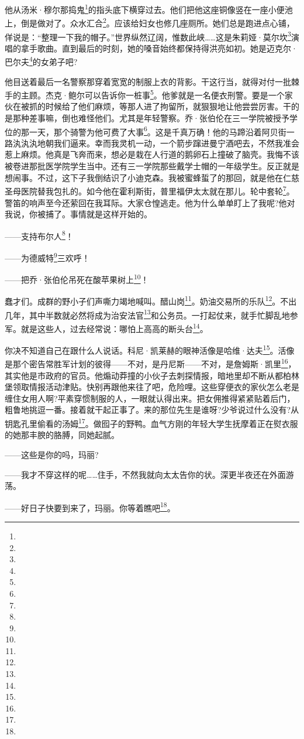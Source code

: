 \par 他从汤米·穆尔那捣鬼\footnote{}的指头底下横穿过去。他们把他这座铜像竖在一座小便池上，倒是做对了。众水汇合\footnote{}。应该给妇女也修几座厕所。她们总是跑进点心铺，佯说是：“整理一下我的帽子。”世界纵然辽阔，惟数此峡……这是朱莉娅·莫尔坎\footnote{}演唱的拿手歌曲。直到最后的时刻，她的嗓音始终都保持得洪亮如初。她是迈克尔·巴尔夫\footnote{}的女弟子吧?
\par 他目送着最后一名警察那穿着宽宽的制服上衣的背影。干这行当，就得对付一批棘手的主顾。杰克·鲍尔可以告诉你一桩事\footnote{}。他爹就是一名便衣刑警。要是一个家伙在被抓的时候给了他们麻烦，等那人进了拘留所，就狠狠地让他尝尝厉害。干的是那种差事嘛，倒也难怪他们。尤其是年轻警察。乔·张伯伦在三一学院被授予学位的那一天，那个骑警为他可费了大事\footnote{}。这是千真万确！他的马蹄沿着阿贝街一路汍汍汍地朝我们逼来。幸而我灵机一动，一个箭步蹿进曼宁酒吧去，不然我准会惹上麻烦。他真是飞奔而来，想必是栽在人行道的鹅卵石上撞破了脑壳。我悔不该被卷进那批医学院学生当中。还有三一学院那些戴学士帽的一年级学生。反正就是想闹事。不过，这下子我倒结识了小迪克森。我被蜜蜂蜇了的那回，就是他在仁慈圣母医院替我包扎的。如今他在霍利斯街，普里福伊太太就在那儿。轮中套轮\footnote{}。警笛的响声至今还萦回在我耳际。大家仓惶逃走。他为什么单单盯上了我呢?他对我说，你被捕了。事情就是这样开始的。
\par ——支持布尔人\footnote{}！
\par ——为德威特\footnote{}三欢呼！
\par ——把乔·张伯伦吊死在酸苹果树上\footnote{}！
\par 蠢才们。成群的野小子们声嘶力竭地喊叫。醋山岗\footnote{}。奶油交易所的乐队\footnote{}。不出几年，其中半数就必然将成为治安法官\footnote{}和公务员。一打起仗来，就手忙脚乱地参军。就是这些人，过去经常说：哪怕上高高的断头台\footnote{}。
\par 你决不知道自己在跟什么人说话。科尼·凯莱赫的眼神活像是哈维·达夫\footnote{}。活像是那个密告常胜军计划的彼得——不对，是丹尼斯——不对，是詹姆斯·凯里\footnote{}，其实他是市政府的官员。他煽动莽撞的小伙子去刺探情报，暗地里却不断从都柏林堡领取情报活动津贴。快别再跟他来往了吧，危险哩。这些穿便衣的家伙怎么老是缠住女用人啊?平素穿惯制服的人，一眼就认得出来。把女佣推得紧紧贴着后门，粗鲁地挑逗一番。接着就干起正事了。来的那位先生是谁呀?少爷说过什么没有?从钥匙孔里偷看的汤姆\footnote{}。做囮子的野鸭。血气方刚的年轻大学生抚摩着正在熨衣服的她那丰腴的胳膊，同她起腻。
\par ——这些是你的吗，玛丽?
\par ——我才不穿这样的呢……住手，不然我就向太太告你的状。深更半夜还在外面游荡。
\par ——好日子快要到来了，玛丽。你等着瞧吧\footnote{}。
